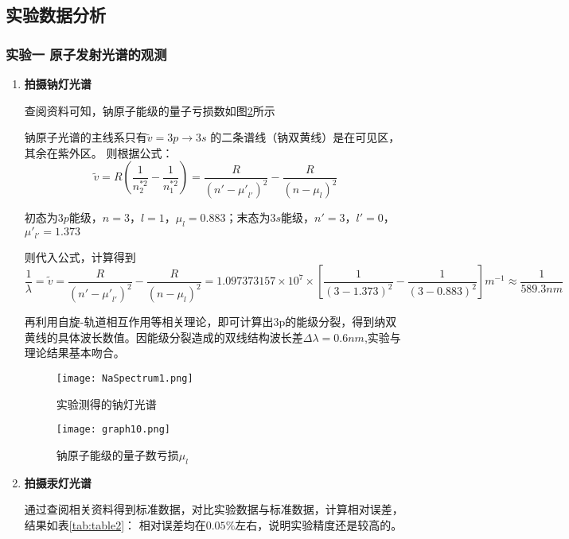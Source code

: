 \documentclass[dvipsnames, svgnames,a4paper,11pt]{article}
\begin{document}
\subsection{实验数据分析}

	\subsubsection{实验一 \quad 原子发射光谱的观测}
		
		\begin{enumerate}
			\item \textbf{拍摄钠灯光谱}
			
				查阅资料可知，钠原子能级的量子亏损数如图\ref{fig:graph10}所示
				
				钠原子光谱的主线系只有$\widetilde{v}=3p \rightarrow 3s$ 的二条谱线（钠双黄线）是在可见区，其余在紫外区。
				则根据公式：
				\[
				\widetilde{v}=R(\frac{1}{n_2^{*2}}-\frac{1}{n_1^{*2}})=\frac{R}{{(n'-{\mu'}_{l'})}^2}-\frac{R}{{(n-\mu_l)}^2}
				\]
				
				初态为$3p$能级，$n=3$，$l=1$，$\mu_l=0.883$；末态为$3s$能级，$n'=3$，$l'=0$，$\mu'_{l'}=1.373$
				
				则代入公式，计算得到
				\[ \frac{1}{\lambda}=\widetilde{v}=\frac{R}{{(n'-{\mu'}_{l'})}^2}-\frac{R}{{(n-\mu_l)}^2}=1.097373157\times10^{7}\times[\frac{1}{(3-1.373)^2}-\frac{1}{(3-0.883)^2}]m^{-1}\approx\frac{1}{589.3nm}
				\]
				
				再利用自旋-轨道相互作用等相关理论，即可计算出3p的能级分裂，得到纳双黄线的具体波长数值。因能级分裂造成的双线结构波长差$\Delta\lambda=0.6nm$,实验与理论结果基本吻合。
				
				\begin{figure}[htbp]
					\centering
					\texttt{[image: NaSpectrum1.png]}
					\caption{实验测得的钠灯光谱}
					\label{fig:NaSpectrum}
				\end{figure}
				
				\begin{figure}[htbp]
					\centering
					\texttt{[image: graph10.png]}
					\caption{钠原子能级的量子数亏损$\mu_l$}
					\label{fig:graph10}
				\end{figure}
				
				
			
			\item \textbf{拍摄汞灯光谱}
				
				通过查阅相关资料得到标准数据，对比实验数据与标准数据，计算相对误差，结果如表\ref{tab:table2}：
				相对误差均在$0.05\%$左右，说明实验精度还是较高的。
				

\end{enumerate}
\end{document}
